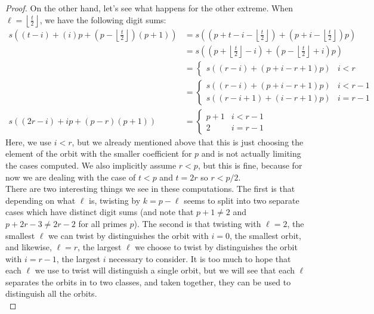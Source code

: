 \documentclass[12pt]{article}
\theoremstyle{customtheorem}%
\theoremstyle{remark}
\theoremstyle{definition}
\numberwithin{equation}{section}
\numberwithin{theorem}{section}
\begin{document}
\begin{proof}
On the other hand, let's see what happens for the other extreme. 
When $\ell = \left\lfloor \frac{t}{2} \right\rfloor$, we have the following digit sums:
\begin{align*}
 s\left((t-i) + (i)p + \left(p - \left\lfloor \frac{t}{2} \right\rfloor\right)(p+1)\right) &= s\left(\left(p + t- i - \left\lfloor \frac{t}{2} \right\rfloor\right) + \left(p + i -\left\lfloor \frac{t}{2} \right\rfloor\right)p\right) \\ 
 &=s\left(\left(p + \left\lfloor \frac{t}{2} \right\rfloor - i\right) + \left(p -\left\lfloor \frac{t}{2} \right\rfloor + i\right)p\right) \\
 &= \begin{cases}
s((r-i) + (p+i-r+1)p) & i < r
 \end{cases} \\
 &= \begin{cases}
s((r-i) + (p+i-r+1)p) & i < r-1 \\
 s((r-i+1) + (i-r+1)p) & i = r-1
 \end{cases} \\
  s((2r-i) + ip + (p - r)(p+1)) &= \begin{cases}
p+1 & i < r-1 \\
2 & i = r-1
 \end{cases}
\end{align*}
Here, we use $i < r$, but we already mentioned above that this is just choosing the element of the orbit with the smaller coefficient for $p$ and is not actually limiting the cases computed. 
We also implicitly assume $r < p$, but this is fine, because for now we are dealing with the case of $t < p$ and $t = 2r$ so $ r < p/2$.
\\

There are two interesting things we see in these computations. 
The first is that depending on what $\ell$ is, twisting by $k = p - \ell$ seems to split into two separate cases which have distinct digit sums (and note that $p+1 \neq 2$ and $p+2r-3 \neq 2r-2$ for all primes $p$). 
The second is that twisting with $\ell = 2$, the smallest $\ell$ we can twist by distinguishes the orbit with $i = 0$, the smallest orbit, and likewise, $\ell = r$, the largest $\ell$ we choose to twist by distinguishes the orbit with $i = r-1$, the largest $i$ necessary to consider. 
It is too much to hope that each $\ell$ we use to twist will distinguish a single orbit, but we will see that each $\ell$ separates the orbits in to two classes, and taken together, they can be used to distinguish all the orbits.
\\


\end{proof}
\end{document}
